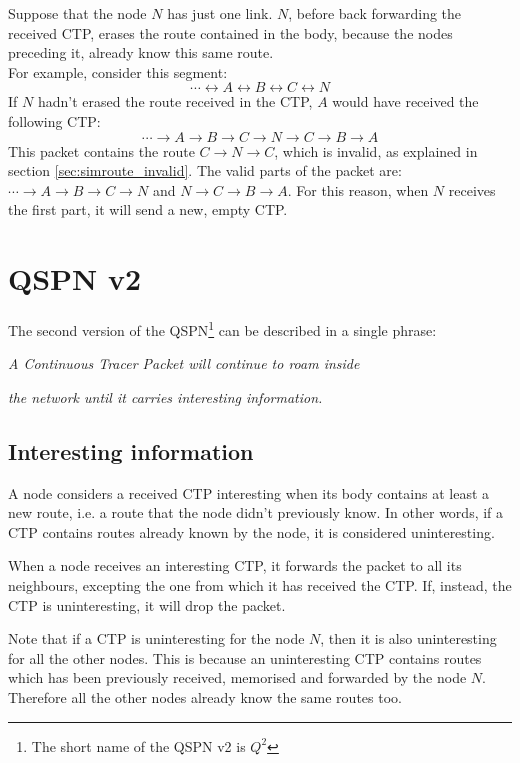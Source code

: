 \documentclass[a4paper]{article}
\begin{document}
Suppose that the node $N$ has just one link.
$N$, before back forwarding the received CTP, erases the route contained in
the body, because the nodes preceding it, already know this same route.
\\
For example, consider this segment:
\[ \cdots \leftrightarrow A \leftrightarrow B \leftrightarrow C \leftrightarrow N \]
If $N$ hadn't erased the route received in the CTP, $A$ would have received
the following CTP:
\[
\cdots \rightarrow A \rightarrow B \rightarrow C \rightarrow N \rightarrow C \rightarrow B \rightarrow A
\]
This packet contains the route $C \rightarrow N \rightarrow C$, which is
invalid, as explained in section \ref{sec:simroute_invalid}.
The valid parts of the packet are: $\cdots \rightarrow A \rightarrow B
\rightarrow C \rightarrow N$ and $N \rightarrow C \rightarrow B \rightarrow
A$. For this reason, when $N$ receives the first part, it will send a new,
empty CTP.

\section{QSPN v2}
\label{sec:QSPNv2}
The second version of the QSPN\footnote{The short name of the QSPN v2 is
$Q^2$} can be described in a single phrase:

\emph{A Continuous Tracer Packet will continue to roam inside}

\emph{the network until it carries interesting information.}

\subsection{Interesting information}
\label{sec:interesting_info}

A node considers a received CTP interesting when its body contains at least a
new route, i.e. a route that the node didn't previously know.
In other words, if a CTP contains routes already known by the node, it is
considered uninteresting.

When a node receives an interesting CTP, it forwards the packet to all its
neighbours, excepting the one from which it has received the CTP.
If, instead, the CTP is uninteresting, it will drop the packet.

Note that if a CTP is uninteresting for the node $N$, then it is also
uninteresting for all the other nodes. This is because an uninteresting CTP
contains routes which has been previously received, memorised and forwarded
by the node $N$. Therefore all the other nodes already know the same
routes too.
\end{document}
